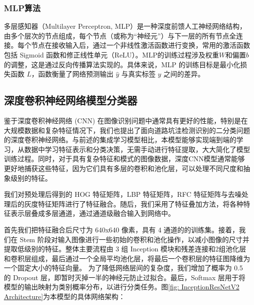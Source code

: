 \documentclass[a4paper, 10pt]{article}
\begin{document}
	\subsubsection{MLP算法}
	
	多层感知器（Multilayer Perceptron, MLP）是一种深度前馈人工神经网络结构，由多个层次的节点组成，每个节点（或称为“神经元”）与下一层的所有节点全连接。每个节点在接收输入后，通过一个非线性激活函数进行变换，常用的激活函数包括 Sigmoid 函数和修正线性单元（ReLU）。MLP的训练过程涉及权重$ W $和偏置$b$的调整，这是通过反向传播算法实现的。具体来说，MLP 的训练目标是最小化损失函数 $L$，函数衡量了网络预测输出 $\hat{y}$ 与真实标签 $y$ 之间的差异。
	
	
	\subsection{深度卷积神经网络模型分类器}
	
	鉴于深度卷积神经网络 (CNN) 在图像识别问题中通常具有更好的性能，特别是在大规模数据和复杂特征情况下，我们也提出了面向道路坑洼检测识别的二分类问题的深度卷积神经网络。与前述的集成学习模型相比，本模型能够实现端到端的学习，从数据中学习特征表示和分类决策，无需手动进行特征提取，大大简化了模型训练过程。同时，对于具有复杂特征和模式的图像数据，深度CNN模型通常能够更好地捕获这些特征，因为它们具有多层的卷积和池化层，可以处理不同尺度和抽象级别的特征。
	
	我们对预处理后得到的 HOG 特征矩阵，LBP 特征矩阵，RFC 特征矩阵与去噪处理后的灰度特征矩阵进行了特征融合。随后，我们采用了特征叠加方法，将各种特征表示层叠成多层通道，通过通道级融合输入到网络中。
	
	首先我们把特征融合后尺寸为 640x640 像素，具有 4 通道的的训练集。接着，我们在 Stem 阶段对输入图像进行一些初始的卷积和池化操作，以减小图像的尺寸并提取低级别的特征。整体主要流程由 3 组 Inception 模块和残差连接和2组池化层和卷积层组成，最后通过一个全局平均池化层，将最后一个卷积层的特征图降维为一个固定大小的特征向量。
	为了降低网络层间的复杂度，我们增加了概率为 0.5 的 Dropout 层，即暂时灭掉一半的神经元防止过拟合。最后，Softmax 层用于将模型的输出映射为类别概率分布，以进行分类任务。图\ref{fig: InceptionResNetV2 Architecture}为本模型的具体网络架构：
	
\end{document}
